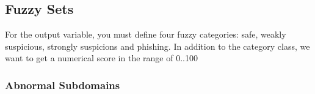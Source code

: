 \documentclass[11pt]{article}
\begin{document}
\subsection{Fuzzy Sets}
For the output variable, you must define four fuzzy categories: safe, weakly 
suspicious, strongly suspicions and phishing. In addition to the category class, we want to get a 
numerical score in the range of 0..100


\subsubsection{Abnormal Subdomains}





\newpage
\printbibliography
\end{document}
